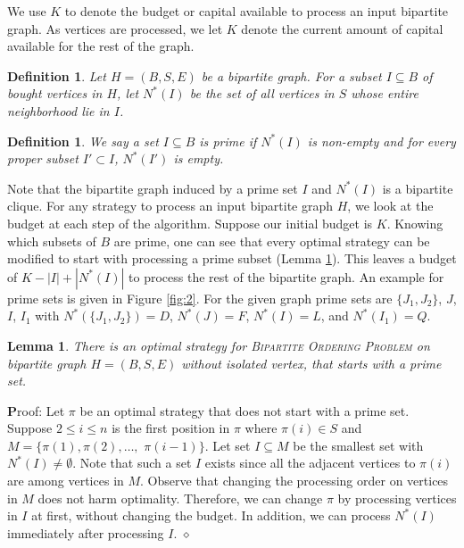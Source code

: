 \documentclass[letterpaper,11pt,abstracton]{scrartcl}
\newcommand{\qed}{\hfill$\diamond$}
\newcommand{\pf}{{\textbf Proof: }}
\newtheorem{lemma}[theorem]{Lemma}
\newtheorem{dfn}[theorem]{Definition}
\begin{document}
We use $K$ to denote the budget or capital available to process an
input bipartite graph.  As vertices are processed, we let $K$ denote the current
amount of capital available for the rest of the graph.

\begin{dfn}\label{def:Nstar}
  Let $H=(B,S,E)$ be a bipartite graph. For a subset $I\subseteq B$ of bought vertices in $H$,
  let {$N^*(I)$} be the set of all vertices in $S$ whose entire neighborhood lie in $I$.
\end{dfn}

\begin{dfn}\label{def:prime}
  We say a set $I \subseteq B $ is {\em prime} if $N^*(I)$ is non-empty and
  for every proper subset $I'\subset I$, $N^*(I')$ is empty.
\end{dfn}

Note that the bipartite graph induced by a prime set $I$ and $N^*(I)$ is a bipartite clique.
For any strategy to process an input bipartite graph $H$, we look at the
budget at each step of the algorithm. Suppose our initial
budget is $K$. Knowing which subsets of $B$ are prime, one can see that every optimal strategy can be 
modified to start with processing a prime subset 
(Lemma \ref{first-prime}). This
leaves a budget of $K-|I|+|N^*(I)|$ to process the rest of the bipartite graph.
An example for prime sets is given in Figure \ref{fig:2}. For the given graph prime sets are $\{J_1,J_2\}$,
 $J$, $I$, $I_1$ with $N^*(\{J_1,J_2\})=D$, $N^*(J)=F$, $N^*(I)=L$, and $N^*(I_1)=Q$.

\begin{lemma}\label{first-prime}
There is an optimal strategy for \textsc{Bipartite Ordering Problem} on bipartite graph $H=(B,S,E)$ without isolated vertex, 
that starts with a prime set.
\end{lemma}
\pf Let $\pi$ be an optimal strategy that does not start with a prime set. Suppose $2\leq i\leq n$ is the first position in $\pi$ where $\pi(i)\in S$ and
$M=\{\pi(1),\pi(2),\dots,$ $\pi(i-1)\}$. Let set $I\subseteq M$ be the smallest set with $N^*(I)\neq\emptyset$. Note that such a set $I$ exists since all the adjacent vertices to $\pi(i)$ are among vertices in $M$. Observe that changing the processing order on vertices in $M$ does not harm optimality. Therefore, we can change $\pi$ by processing vertices in $I$ at first, without changing the budget. In addition, we can process $N^*(I)$ immediately after processing $I$.
\qed \\
\end{document}
